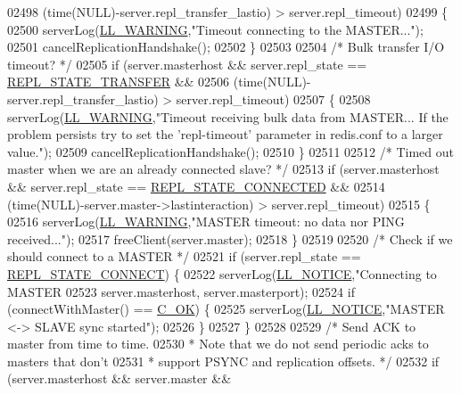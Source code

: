 \begin{DoxyCode}
{{{{{{{{{{{{{{{{{{{{{{{{{{{{{{{{{{{{{{{{{{{{{{{{{{{{{{{{{{{{{{{{{{{{{{{{{{{02498          (time(NULL)-server.repl\_transfer\_lastio) > server.repl\_timeout)
02499     \{
02500         serverLog(\hyperlink{server_8h_a31229b9334bba7d6be2a72970967a14b}{LL\_WARNING},\textcolor{stringliteral}{"Timeout connecting to the MASTER..."});
02501         cancelReplicationHandshake();
02502     \}
02503 
02504     \textcolor{comment}{/* Bulk transfer I/O timeout? */}
02505     \textcolor{keywordflow}{if} (server.masterhost && server.repl\_state == \hyperlink{server_8h_a1d27594a2d9c8d24e4ed5a2e88d1113e}{REPL\_STATE\_TRANSFER} &&
02506         (time(NULL)-server.repl\_transfer\_lastio) > server.repl\_timeout)
02507     \{
02508         serverLog(\hyperlink{server_8h_a31229b9334bba7d6be2a72970967a14b}{LL\_WARNING},\textcolor{stringliteral}{"Timeout receiving bulk data from MASTER... If the problem
       persists try to set the 'repl-timeout' parameter in redis.conf to a larger value."});
02509         cancelReplicationHandshake();
02510     \}
02511 
02512     \textcolor{comment}{/* Timed out master when we are an already connected slave? */}
02513     \textcolor{keywordflow}{if} (server.masterhost && server.repl\_state == \hyperlink{server_8h_aed693b3a9cdfc05cf5ab7551a8c86fbe}{REPL\_STATE\_CONNECTED} &&
02514         (time(NULL)-server.master->lastinteraction) > server.repl\_timeout)
02515     \{
02516         serverLog(\hyperlink{server_8h_a31229b9334bba7d6be2a72970967a14b}{LL\_WARNING},\textcolor{stringliteral}{"MASTER timeout: no data nor PING received..."});
02517         freeClient(server.master);
02518     \}
02519 
02520     \textcolor{comment}{/* Check if we should connect to a MASTER */}
02521     \textcolor{keywordflow}{if} (server.repl\_state == \hyperlink{server_8h_adfe013d4a620f0b98b47b2144760e69f}{REPL\_STATE\_CONNECT}) \{
02522         serverLog(\hyperlink{server_8h_a8c54c191e436c7dd3012167212692401}{LL\_NOTICE},\textcolor{stringliteral}{"Connecting to MASTER %
02523             server.masterhost, server.masterport);
02524         \textcolor{keywordflow}{if} (connectWithMaster() == \hyperlink{server_8h_a303769ef1065076e68731584e758d3e1}{C\_OK}) \{
02525             serverLog(\hyperlink{server_8h_a8c54c191e436c7dd3012167212692401}{LL\_NOTICE},\textcolor{stringliteral}{"MASTER <-> SLAVE sync started"});
02526         \}
02527     \}
02528 
02529     \textcolor{comment}{/* Send ACK to master from time to time.}
02530 \textcolor{comment}{     * Note that we do not send periodic acks to masters that don't}
02531 \textcolor{comment}{     * support PSYNC and replication offsets. */}
02532     \textcolor{keywordflow}{if} (server.masterhost && server.master &&
}}}}}}}}}}}}}}}}}}}}}}}}}}}}}}}}}}}}}}}}}}}}}}}}}}}}}}}}}}}}}}}}}}}}}}}}}}}}
\end{DoxyCode}
